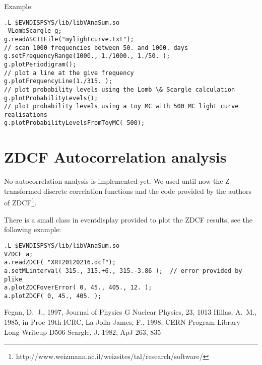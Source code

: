 \documentclass[titlepage,a4paper,twoside,11pt]{report}
\begin{document}
Example:

\begin{lstlisting}
.L $EVNDISPSYS/lib/libVAnaSum.so 
 VLombScargle g;
g.readASCIIFile("mylightcurve.txt");
// scan 1000 frequencies between 50. and 1000. days
g.setFrequencyRange(1000., 1./1000., 1./50. );
g.plotPeriodigram();
// plot a line at the give frequency
g.plotFrequencyLine(1./315. );
// plot probability levels using the Lomb \& Scargle calculation
g.plotProbabilityLevels();
// plot probability levels using a toy MC with 500 MC light curve realisations
g.plotProbabilityLevelsFromToyMC( 500);
\end{lstlisting}

\section{ZDCF Autocorrelation analysis}

No autocorrelation analysis is implemented yet. We used until now the Z-transformed discrete correlation functions and the code provided by the authors of ZDCF\footnote{http://www.weizmann.ac.il/weizsites/tal/research/software/}.

There is a small class in eventdisplay provided to plot the ZDCF results, see the following example:

\begin{lstlisting}
.L $EVNDISPSYS/lib/libVAnaSum.so 
VZDCF a;
a.readZDCF( "XRT20120216.dcf");
a.setMLinterval( 315., 315.+6., 315.-3.86 );  // error provided by plike
a.plotZDCFoverError( 0, 45., 405., 12. );
a.plotZDCF( 0, 45., 405. );
\end{lstlisting}






%
%
%


\begin{thebibliography}{}
  Fegan, D.~J., 1997, Journal of Physics G Nuclear Physics, 23, 1013
  Hillas, A.~M., 1985, in Proc 19th ICRC, La Jolla 
  James, F., 1998, CERN Program Library Long Writeup D506
  Scargle, J. 1982, ApJ 263, 835

\end{thebibliography}
\end{document}

